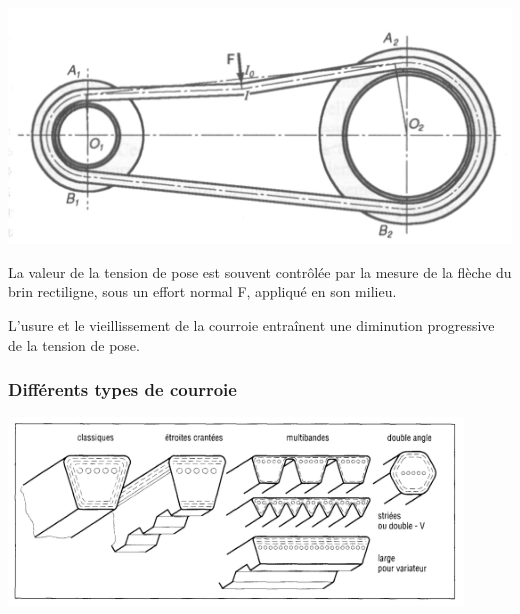 \documentclass[11pt,oneside]{article}
\begin{document}
\begin{minipage}[c]{.45\linewidth}
\begin{center}
\includegraphics[width=.9\textwidth]{png/fig_46}
\end{center}
\end{minipage} \hfill
\begin{minipage}[c]{.5\linewidth}
La valeur de la tension de pose est souvent contrôlée par la mesure de la flèche du brin rectiligne, sous un effort normal F, appliqué en son milieu.
\end{minipage} 

L’usure et le vieillissement de la courroie entraînent une diminution progressive de la tension de pose.

\subsubsection{Différents types de courroie}

\begin{center}
\includegraphics[height=5cm]{png/fig_47}
\end{center}
\end{document}
